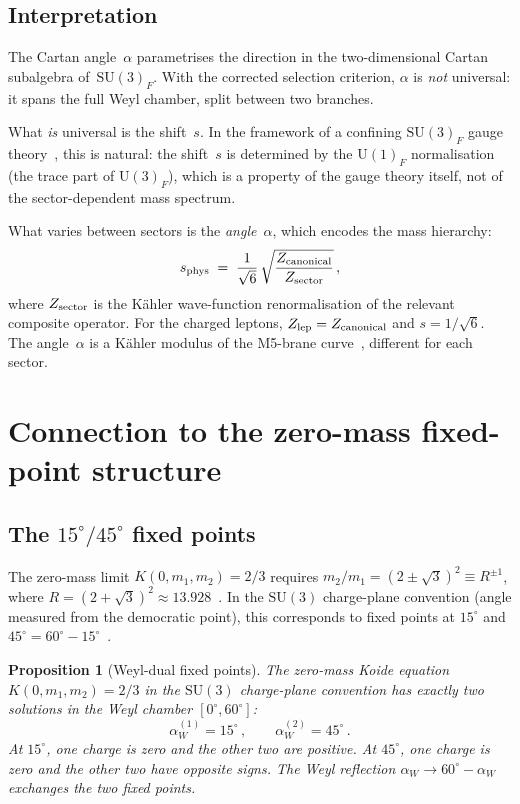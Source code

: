 \documentclass[preprint,12pt]{elsarticle}
\newtheorem{proposition}[theorem]{Proposition}
\newcommand{\SU}{\mathrm{SU}}
\newcommand{\UU}{\mathrm{U}}
\begin{document}
\subsection{Interpretation}

The Cartan angle~$\alpha$ parametrises the direction in the
two-dimensional Cartan subalgebra of~$\SU(3)_F$.
With the corrected selection criterion, $\alpha$ is
\emph{not} universal: it spans the full Weyl chamber,
split between two branches.

What \emph{is} universal is the shift~$s$.
In the framework of a confining $\SU(3)_F$ gauge
theory~\cite{letter_q2}, this is natural: the shift~$s$
is determined by the $\UU(1)_F$ normalisation
(the trace part of $\UU(3)_F$), which is a property of the
gauge theory itself, not of the sector-dependent mass
spectrum.

What varies between sectors is the \emph{angle}~$\alpha$,
which encodes the mass hierarchy:
\begin{equation}
  s_{\rm phys} \;=\; \frac{1}{\sqrt{6}}\,
  \sqrt{\frac{Z_{\rm canonical}}{Z_{\rm sector}}}\,,
  \label{eq:s_Z}
\end{equation}
where $Z_{\rm sector}$ is the K\"ahler wave-function
renormalisation of the relevant composite operator.
For the charged leptons,
$Z_{\rm lep} = Z_{\rm canonical}$ and $s = 1/\sqrt{6}$.
The angle~$\alpha$ is a K\"ahler modulus of the M5-brane
curve~\cite{letter_q2}, different for each sector.


\section{Connection to the zero-mass fixed-point structure}
\label{sec:fixed_points}

\subsection{The $15^\circ/45^\circ$ fixed points}

The zero-mass limit $K(0, m_1, m_2) = 2/3$ requires
$m_2/m_1 = (2 \pm \sqrt{3})^2 \equiv R^{\pm 1}$,
where $R = (2 + \sqrt{3})^2 \approx 13.928$~\cite{Rivero:2005}.
In the $\SU(3)$ charge-plane convention (angle measured
from the democratic point), this corresponds to fixed points
at $15^\circ$ and $45^\circ = 60^\circ - 15^\circ$~\cite{note98}.

\begin{proposition}[Weyl-dual fixed points]
\label{prop:weyl_fp}
The zero-mass Koide equation $K(0, m_1, m_2) = 2/3$
in the $\SU(3)$ charge-plane convention has exactly two
solutions in the Weyl chamber $[0^\circ, 60^\circ]$:
\begin{equation}
  \alpha_W^{(1)} = 15^\circ\,,\qquad
  \alpha_W^{(2)} = 45^\circ\,.
  \label{eq:fp}
\end{equation}
At $15^\circ$, one charge is zero and the other two are positive.
At $45^\circ$, one charge is zero and the other two have
opposite signs.  The Weyl reflection
$\alpha_W \to 60^\circ - \alpha_W$ exchanges the two fixed points.
\end{proposition}
\end{document}
